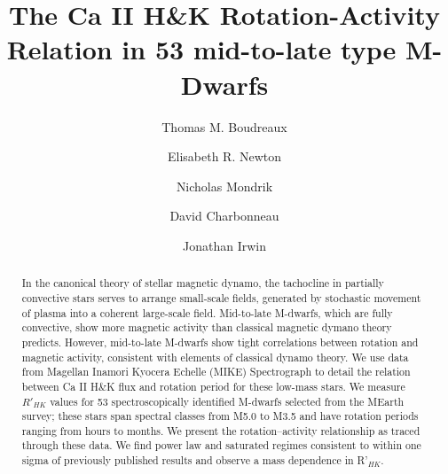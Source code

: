 \documentclass[linenumbers]{aastex62}
\begin{document}
\title{The Ca II H\&K Rotation-Activity Relation in 53 mid-to-late type M-Dwarfs}

\author[0000-0002-2600-7513]{Thomas M. Boudreaux}

\author[0000-0003-4150-841X]{Elisabeth R. Newton}

\author[0000-0003-0295-293X]{Nicholas Mondrik}

\author[0000-0002-9003-484X]{David Charbonneau}

\author{Jonathan Irwin}





\begin{abstract}
In the canonical theory of stellar magnetic dynamo, the tachocline in partially
	convective stars serves to arrange small-scale fields, generated by
	stochastic movement of plasma into a coherent large-scale field.
	Mid-to-late M-dwarfs, which are fully convective, show more magnetic
	activity than classical magnetic dymano theory predicts. However,
	mid-to-late M-dwarfs show tight correlations between rotation and magnetic
	activity, consistent with elements of classical dynamo theory. We use data
	from Magellan Inamori Kyocera Echelle (MIKE) Spectrograph to detail the
	relation between Ca II H\&K flux and rotation period for these low-mass
	stars. We measure $R'_{HK}$ values for 53 spectroscopically identified
	M-dwarfs selected from the MEarth survey; these stars span spectral classes
	from M5.0 to M3.5 and have rotation periods ranging from hours to months.
	We present the rotation--activity relationship as traced through these
	data. We find power law and saturated regimes consistent to within one
	sigma of previously published results and observe a mass dependence in
	R'$_{HK}$.
\vspace{1cm}
\end{abstract}



\end{document}

